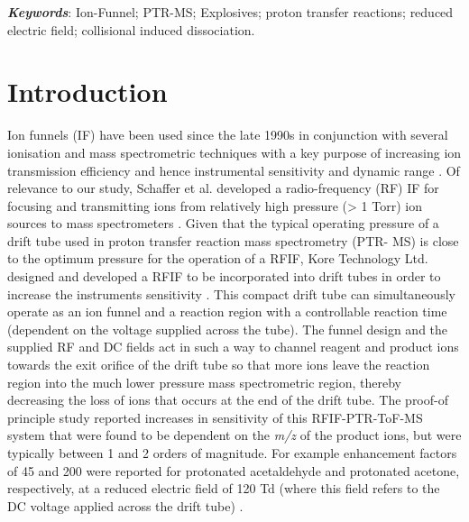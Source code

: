 \textbf{\textit{Keywords}}: Ion-Funnel; PTR-MS; Explosives; proton transfer reactions; reduced electric field; collisional induced dissociation.





\section{Introduction}

Ion funnels (IF) have been used since the late 1990s in conjunction with several ionisation and mass spectrometric techniques with a key purpose of increasing ion transmission efficiency and hence instrumental sensitivity and dynamic range \cite{shaffer1997novel,kelly2010ion}. Of relevance to our study, Schaffer et al. developed a radio-frequency (RF) IF for focusing and transmitting ions from relatively high pressure (> 1 Torr) ion sources to mass spectrometers \cite{shaffer1997novel}. Given that the typical operating pressure of a drift tube used in proton transfer reaction mass spectrometry (PTR- MS) is close to the optimum pressure for the operation of a RFIF, Kore Technology Ltd. designed and developed a RFIF to be incorporated into drift tubes in order to increase the instruments sensitivity \cite{barber2012increased}. This compact drift tube can simultaneously operate as an ion funnel and a reaction region with a controllable reaction time (dependent on the voltage supplied across the tube). The funnel design and the supplied RF and DC fields act in such a way to channel reagent and product ions towards the exit orifice of the drift tube so that more ions leave the reaction region into the much lower pressure mass spectrometric region, thereby decreasing the loss of ions that occurs at the end of the drift tube. The proof-of principle study reported increases in sensitivity of this RFIF-PTR-ToF-MS system that were found to be dependent on the \textit{m/z} of the product ions, but were typically between 1 and 2 orders of magnitude. For example enhancement factors of 45 and 200 were reported for protonated acetaldehyde and protonated acetone, respectively, at a reduced electric field of 120 Td (where this field refers to the DC voltage applied across the drift tube) \cite{barber2012increased}. 

